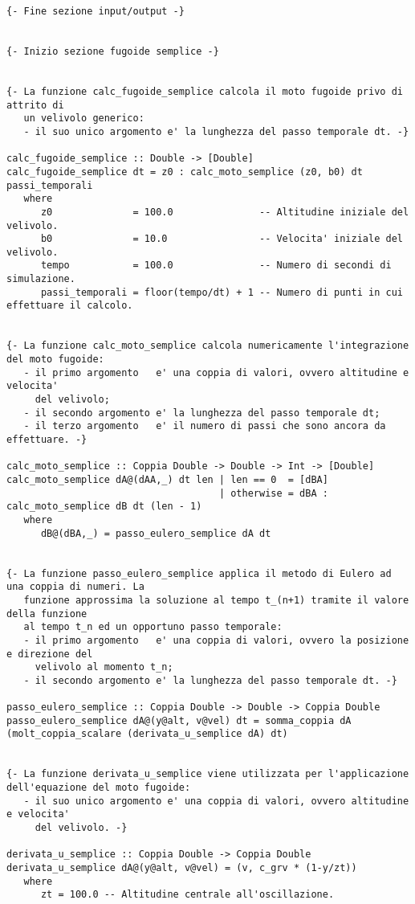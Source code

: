 \begin{verbatim}
{- Fine sezione input/output -}


{- Inizio sezione fugoide semplice -}


{- La funzione calc_fugoide_semplice calcola il moto fugoide privo di attrito di 
   un velivolo generico:
   - il suo unico argomento e' la lunghezza del passo temporale dt. -}

calc_fugoide_semplice :: Double -> [Double]
calc_fugoide_semplice dt = z0 : calc_moto_semplice (z0, b0) dt passi_temporali
   where
      z0              = 100.0               -- Altitudine iniziale del velivolo.
      b0              = 10.0                -- Velocita' iniziale del velivolo.
      tempo           = 100.0               -- Numero di secondi di simulazione.
      passi_temporali = floor(tempo/dt) + 1 -- Numero di punti in cui effettuare il calcolo.


{- La funzione calc_moto_semplice calcola numericamente l'integrazione del moto fugoide:
   - il primo argomento   e' una coppia di valori, ovvero altitudine e velocita' 
     del velivolo;
   - il secondo argomento e' la lunghezza del passo temporale dt;
   - il terzo argomento   e' il numero di passi che sono ancora da effettuare. -}

calc_moto_semplice :: Coppia Double -> Double -> Int -> [Double]
calc_moto_semplice dA@(dAA,_) dt len | len == 0  = [dBA]
                                     | otherwise = dBA : calc_moto_semplice dB dt (len - 1)
   where
      dB@(dBA,_) = passo_eulero_semplice dA dt


{- La funzione passo_eulero_semplice applica il metodo di Eulero ad una coppia di numeri. La
   funzione approssima la soluzione al tempo t_(n+1) tramite il valore della funzione 
   al tempo t_n ed un opportuno passo temporale:
   - il primo argomento   e' una coppia di valori, ovvero la posizione e direzione del 
     velivolo al momento t_n;
   - il secondo argomento e' la lunghezza del passo temporale dt. -}

passo_eulero_semplice :: Coppia Double -> Double -> Coppia Double
passo_eulero_semplice dA@(y@alt, v@vel) dt = somma_coppia dA (molt_coppia_scalare (derivata_u_semplice dA) dt)


{- La funzione derivata_u_semplice viene utilizzata per l'applicazione dell'equazione del moto fugoide:
   - il suo unico argomento e' una coppia di valori, ovvero altitudine e velocita' 
     del velivolo. -}

derivata_u_semplice :: Coppia Double -> Coppia Double
derivata_u_semplice dA@(y@alt, v@vel) = (v, c_grv * (1-y/zt))
   where
      zt = 100.0 -- Altitudine centrale all'oscillazione.



\end{verbatim}
